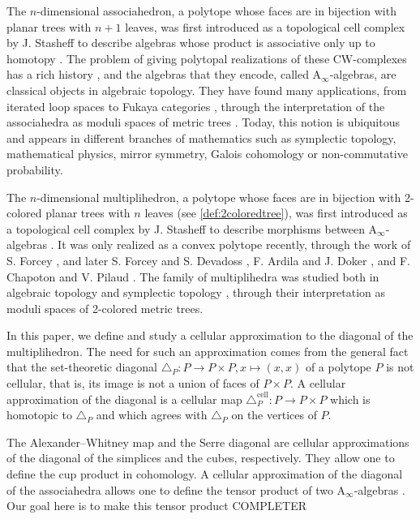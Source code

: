 \documentclass[twoside, 12pt]{amsart}
\theoremstyle{remark}
\begin{document}

The $n$-dimensional associahedron, a polytope whose faces are in bijection with planar trees with $n+1$ leaves, was first introduced as a topological cell complex by J. Stasheff to describe algebras whose product is associative only up to homotopy \cite{Stasheff63}.
The problem of giving polytopal realizations of these CW-complexes has a rich history \cite{CeballosZiegler12}, and the algebras that they encode, called $\mathrm{A}_\infty$-algebras, are classical objects in algebraic topology. 
They have found many applications, from iterated loop spaces \cite{May72} to Fukaya categories \cite{Seidel08}, through the interpretation of the associahedra as moduli spaces of metric trees \cite{MauWoodward10}.
Today, this notion is ubiquitous and appears in different branches of mathematics such as symplectic topology, mathematical physics, mirror symmetry, Galois cohomology or non-commutative probability.

\medskip

The $n$-dimensional multiplihedron, a polytope whose faces are in bijection with 2-colored planar trees with $n$ leaves (see \cref{def:2coloredtree}), was first introduced as a topological cell complex by J. Stasheff to describe morphisms between $\mathrm{A}_\infty$-algebras \cite{Stasheff70}.
It was only realized as a convex polytope recently, through the work of S. Forcey \cite{Forcey08}, and later S. Forcey and S. Devadoss \cite{DevadossForcey08}, F. Ardila and J. Doker \cite{AD13}, and F. Chapoton and V. Pilaud \cite{CP22}.
The family of multiplihedra was studied both in algebraic topology \cite{BoardmanVogt73} and symplectic topology \cite{MauWoodward10,Mazuir21}, through their interpretation as moduli spaces of 2-colored metric trees. 

\medskip

In this paper, we define and study a cellular approximation to the diagonal of the multiplihedron. 
The need for such an approximation comes from the general fact that the set-theoretic diagonal $\triangle_P:P\to P\times P, x\mapsto (x,x)$ of a polytope $P$ is not cellular, that is, its image is not a union of faces of $P\times P$. 
A cellular approximation of the diagonal is a cellular map $\triangle_P^{\textrm{cell}} : P \to P\times P$ which is homotopic to $\triangle_P$ and which agrees with $\triangle_P$ on the vertices of $P$.

\medskip

The Alexander--Whitney map \cite{EilenbergMacLane53} and the Serre diagonal \cite{Serre51} are cellular approximations of the diagonal of the simplices and the cubes, respectively. 
They allow one to define the cup product in cohomology.
A cellular approximation of the diagonal of the associahedra allows one to define the tensor product of two $\mathrm{A}_\infty$-algebras \cite{SaneblidzeUmble04,MarklShnider06,MTTV19}. 
Our goal here is to make this tensor product COMPLETER
\end{document}
